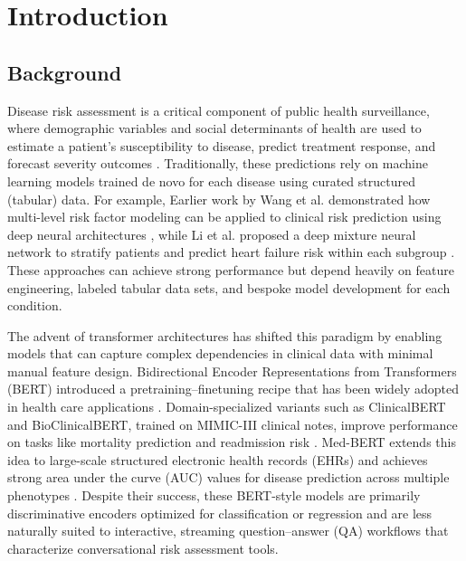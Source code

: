 \section{Introduction}
\label{chap:Introduction}

\subsection{Background}

Disease risk assessment is a critical component of public health surveillance, where demographic variables and social determinants of health are used to estimate a patient’s susceptibility to disease, predict treatment response, and forecast severity outcomes \cite{li2018leveraging,wang2019prioritization,li2020predicting}. Traditionally, these predictions rely on machine learning models trained de novo for each disease using curated structured (tabular) data. For example, Earlier work by Wang et al. demonstrated how multi-level risk factor modeling can be applied to clinical risk prediction using deep neural architectures \cite{wang2019prioritization}, while Li et al. proposed a deep mixture neural network to stratify patients and predict heart failure risk within each subgroup \cite{li2020predicting}. These approaches can achieve strong performance but depend heavily on feature engineering, labeled tabular data sets, and bespoke model development for each condition.

The advent of transformer architectures has shifted this paradigm by enabling models that can capture complex dependencies in clinical data with minimal manual feature design. Bidirectional Encoder Representations from Transformers (BERT) introduced a pretraining–finetuning recipe that has been widely adopted in health care applications \cite{devlin2019bert}. Domain-specialized variants such as ClinicalBERT and BioClinicalBERT, trained on MIMIC-III clinical notes, improve performance on tasks like mortality prediction and readmission risk \cite{huang2019clinicalbert,alsentzer2019publicly}. Med-BERT extends this idea to large-scale structured electronic health records (EHRs) and achieves strong area under the curve (AUC) values for disease prediction across multiple phenotypes \cite{rasmy2021medbert}. Despite their success, these BERT-style models are primarily discriminative encoders optimized for classification or regression and are less naturally suited to interactive, streaming question–answer (QA) workflows that characterize conversational risk assessment tools.

